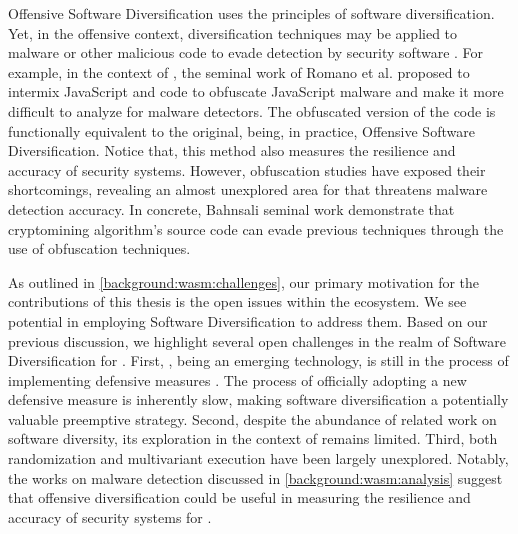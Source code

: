 Offensive Software Diversification uses the principles of software diversification.
Yet, in the offensive context, diversification techniques may be applied to malware or other malicious code to evade detection by security software \cite{8714698}.
For example, in the context of \wasm, the seminal work of Romano et al.  \cite{wobfuscator} proposed to intermix JavaScript and \wasm code to obfuscate JavaScript malware and make it more difficult to analyze for malware detectors.
The obfuscated version of the code is functionally equivalent to the original, being, in practice, Offensive Software Diversification.
Notice that, this method also measures the resilience and accuracy of security systems.
However, obfuscation studies have exposed their shortcomings, revealing an almost unexplored area for \Wasm that threatens malware detection accuracy.
In concrete, Bahnsali \etal seminal work\cite{10.1145/3507657.3528560} demonstrate that cryptomining algorithm's source code can evade previous techniques through the use of obfuscation techniques.

\label{sota:openchallenges}
As outlined in \autoref{background:wasm:challenges}, our primary motivation for the contributions of this thesis is the open issues within the \Wasm ecosystem. 
We see potential in employing Software Diversification to address them. 
Based on our previous discussion, we highlight several open challenges in the realm of Software Diversification for \Wasm. 
First, \Wasm, being an emerging technology, is still in the process of implementing defensive measures \cite{Stevienart paper here}. 
The process of officially adopting a new defensive measure is inherently slow, making software diversification a potentially valuable preemptive strategy. 
Second, despite the abundance of related work on software diversity, its exploration in the context of \Wasm remains limited. 
Third, both randomization and multivariant execution have been largely unexplored. 
Notably, the works on malware detection discussed in \autoref{background:wasm:analysis} suggest that offensive diversification could be useful in measuring the resilience and accuracy of security systems for \Wasm.






